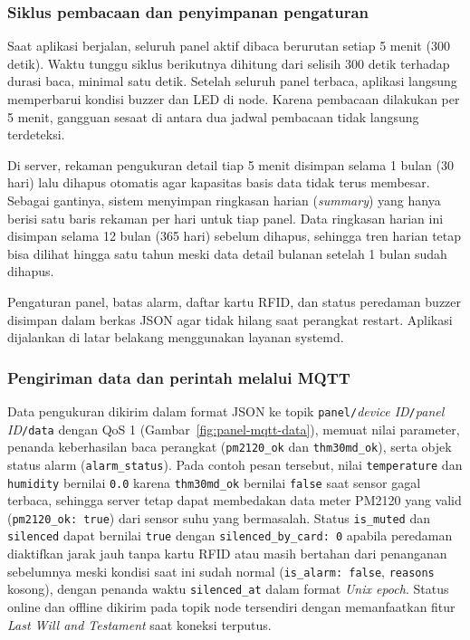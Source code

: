 

\subsubsection{Siklus pembacaan dan penyimpanan pengaturan}

Saat aplikasi berjalan, seluruh panel aktif dibaca berurutan setiap 5 menit (300 detik). Waktu tunggu siklus berikutnya dihitung dari selisih 300 detik terhadap durasi baca, minimal satu detik. Setelah seluruh panel terbaca, aplikasi langsung memperbarui kondisi buzzer dan LED di node. Karena pembacaan dilakukan per 5 menit, gangguan sesaat di antara dua jadwal pembacaan tidak langsung terdeteksi.

Di server, rekaman pengukuran detail tiap 5 menit disimpan selama 1 bulan (30 hari) lalu dihapus otomatis agar kapasitas basis data tidak terus membesar. Sebagai gantinya, sistem menyimpan ringkasan harian (\textit{summary}) yang hanya berisi satu baris rekaman per hari untuk tiap panel. Data ringkasan harian ini disimpan selama 12 bulan (365 hari) sebelum dihapus, sehingga tren harian tetap bisa dilihat hingga satu tahun meski data detail bulanan setelah 1 bulan sudah dihapus.

Pengaturan panel, batas alarm, daftar kartu RFID, dan status peredaman buzzer disimpan dalam berkas JSON agar tidak hilang saat perangkat restart. Aplikasi dijalankan di latar belakang menggunakan layanan systemd.

\subsubsection{Pengiriman data dan perintah melalui MQTT}

Data pengukuran dikirim dalam format JSON ke topik \texttt{panel/}\textit{device ID}\texttt{/}\textit{panel ID}\texttt{/data} dengan QoS 1 (Gambar~\ref{fig:panel-mqtt-data}), memuat nilai parameter, penanda keberhasilan baca perangkat (\texttt{pm2120\_ok} dan \texttt{thm30md\_ok}), serta objek status alarm (\texttt{alarm\_status}). Pada contoh pesan tersebut, nilai \texttt{temperature} dan \texttt{humidity} bernilai \texttt{0.0} karena \texttt{thm30md\_ok} bernilai \texttt{false} saat sensor gagal terbaca, sehingga server tetap dapat membedakan data meter PM2120 yang valid (\texttt{pm2120\_ok: true}) dari sensor suhu yang bermasalah. Status \texttt{is\_muted} dan \texttt{silenced} dapat bernilai \texttt{true} dengan \texttt{silenced\_by\_card: 0} apabila peredaman diaktifkan jarak jauh tanpa kartu RFID atau masih bertahan dari penanganan sebelumnya meski kondisi saat ini sudah normal (\texttt{is\_alarm: false}, \texttt{reasons} kosong), dengan penanda waktu \texttt{silenced\_at} dalam format \textit{Unix epoch}. Status online dan offline dikirim pada topik node tersendiri dengan memanfaatkan fitur \textit{Last Will and Testament} saat koneksi terputus.

